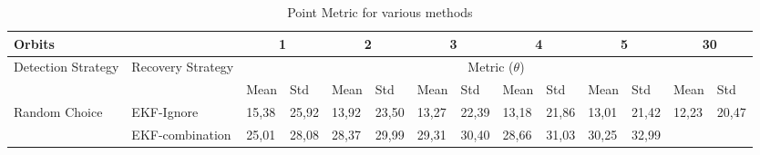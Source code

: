 \documentclass[letterpaper, 10 pt, conference]{ieeeconf}  %
\begin{document}


\begin{table*}[]
	\label{Table: Point Metric for various methods}
	\caption{Point Metric for various methods}
	\begin{tabular}{@{}llllllllllllll@{}}
		\toprule
		\multicolumn{2}{l}{Orbits} &
		\multicolumn{2}{c}{1} &
		\multicolumn{2}{c}{2} &
		\multicolumn{2}{c}{3} &
		\multicolumn{2}{c}{4} &
		\multicolumn{2}{c}{5} &
		\multicolumn{2}{c}{30} \\ \midrule
		\multicolumn{1}{|l|}{\multirow{2}{*}{Detection Strategy}} &
		\multicolumn{1}{l|}{\multirow{2}{*}{Recovery Strategy}} &
		\multicolumn{12}{c|}{Metric ($\theta$)} \\ \cmidrule(l){3-14} 
		\multicolumn{1}{|l|}{} &
		\multicolumn{1}{l|}{} &
		\multicolumn{1}{l|}{Mean} &
		\multicolumn{1}{l|}{Std} &
		\multicolumn{1}{l|}{Mean} &
		\multicolumn{1}{l|}{Std} &
		\multicolumn{1}{l|}{Mean} &
		\multicolumn{1}{l|}{Std} &
		\multicolumn{1}{l|}{Mean} &
		\multicolumn{1}{l|}{Std} &
		\multicolumn{1}{l|}{Mean} &
		\multicolumn{1}{l|}{Std} &
		\multicolumn{1}{l|}{Mean} &
		\multicolumn{1}{l|}{Std} \\ \midrule
		\multicolumn{1}{|l|}{\multirow{4}{*}{Random Choice}} &
		\multicolumn{1}{l|}{EKF-Ignore} &
		\multicolumn{1}{l|}{15,38} &
		\multicolumn{1}{l|}{25,92} &
		\multicolumn{1}{l|}{13,92} &
		\multicolumn{1}{l|}{23,50} &
		\multicolumn{1}{l|}{13,27} &
		\multicolumn{1}{l|}{22,39} &
		\multicolumn{1}{l|}{13,18} &
		\multicolumn{1}{l|}{21,86} &
		\multicolumn{1}{l|}{13,01} &
		\multicolumn{1}{l|}{21,42} &
		\multicolumn{1}{l|}{12,23} &
		\multicolumn{1}{l|}{20,47} \\ \cmidrule(l){2-14} 
		\multicolumn{1}{|l|}{} &
		\multicolumn{1}{l|}{EKF-combination} &
		\multicolumn{1}{l|}{25,01} &
		\multicolumn{1}{l|}{28,08} &
		\multicolumn{1}{l|}{28,37} &
		\multicolumn{1}{l|}{29,99} &
		\multicolumn{1}{l|}{29,31} &
		\multicolumn{1}{l|}{30,40} &
		\multicolumn{1}{l|}{28,66} &
		\multicolumn{1}{l|}{31,03} &
		\multicolumn{1}{l|}{30,25} &
		\multicolumn{1}{l|}{32,99} &

\end{tabular}
\end{table*}
\end{document}
